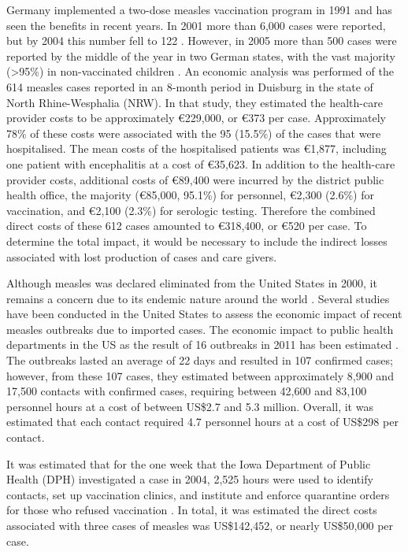 \documentclass{article}
\begin{document}
Germany implemented a two-dose measles vaccination program in 1991 and has seen the benefits in recent years. In 2001 more than 6,000 cases were reported, but by 2004 this number fell to 122 \citep{wichmann9}. However, in 2005 more than 500 cases were reported by the middle of the year in two German states, with the vast majority (>95\%) in non-vaccinated children \citep{siedler6}. An economic analysis was performed of the 614 measles cases reported in an 8-month period in Duisburg in the state of North Rhine-Wesphalia (NRW). In that study, they estimated the health-care provider costs to be approximately \euro 229,000, or \euro 373 per case. Approximately 78\% of these costs were associated with the 95 (15.5\%) of the cases that were hospitalised. The mean costs of the hospitalised patients was  \euro 1,877, including one patient with encephalitis at a cost of \euro 35,623. In addition to the health-care provider costs, additional costs of \euro 89,400 were incurred by the district public health office, the majority (\euro 85,000, 95.1\%) for personnel, \euro 2,300 (2.6\%) for vaccination, and \euro 2,100 (2.3\%) for serologic testing. Therefore the combined direct costs of these 612 cases amounted to \euro 318,400, or \euro 520 per case. To determine the total impact, it would be necessary to include the indirect losses associated with lost production of cases and care givers.

Although measles was declared eliminated from the United States in 2000, it remains a concern due to its endemic nature around the world \citep{parker6}. Several studies have been conducted in the United States to assess the economic impact of recent measles outbreaks due to imported cases.  The economic impact to public health departments in the US as the result of 16 outbreaks in 2011 has been estimated \citep{ortegasanchez14}. The outbreaks lasted an average of 22 days and resulted in 107 confirmed cases; however, from these 107 cases, they estimated between approximately 8,900 and 17,500 contacts with confirmed cases, requiring between 42,600 and 83,100 personnel hours at a cost of between US\$2.7 and 5.3 million. Overall, it was estimated that each contact required 4.7 personnel hours at a cost of US\$298 per contact.

It was estimated that for the one week that the Iowa Department of Public Health (DPH) investigated a case in 2004, 2,525 hours were used to identify contacts, set up vaccination clinics, and institute and enforce quarantine orders for those who refused vaccination \citep{dayan5}. In total, it was estimated the direct costs associated with three cases of measles was US\$142,452, or nearly US\$50,000 per case.
\end{document}
